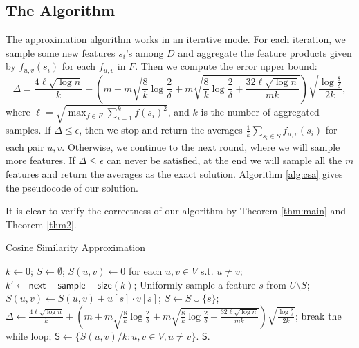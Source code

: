 \documentclass{article}
\begin{document}
\subsection{The Algorithm}
The approximation algorithm works in an iterative mode. For each iteration, we sample some new features $s_i$'s among $D$ and aggregate the feature products given by $f_{u,v}(s_i)$ for each $f_{u,v}$ in $F$. Then we compute the error upper bound:
$$\Delta = \frac{4\ell\sqrt{\log n}}{k} +\left(m+m\sqrt{\frac{8}{k}\log \frac{2}{\delta}} + m\sqrt{\frac{8}{k}\log \frac{2}{\delta} + \frac{32\ell\sqrt{\log n}}{mk}}\right)\sqrt{\frac{\log \frac{8}{\delta}}{2k}},$$
where $\ell = \sqrt{\max_{f\in F} \sum_{i=1}^k f(s_i)^2}$, and $k$ is the number of aggregated samples. 
If $\Delta \leq \epsilon$, then we stop and return the averages $\frac{1}{k}\sum_{s_i\in S}f_{u,v}(s_i)$ for each pair $u, v$. Otherwise, we continue to the next round, where we will sample more features. If $\Delta \leq \epsilon$ can never be satisfied, at the end we will sample all the $m$ features and return the averages as the exact solution. Algorithm \ref{alg:csa} gives the pseudocode of our solution.

It is clear to verify the correctness of our algorithm by Theorem \ref{thm:main} and Theorem \ref{thm2}.

\begin{algorithm}[!t]
\caption{\textsf{Cosine Similarity Approximation}}
\label{alg:csa}
\renewcommand{\algorithmicrequire}{\textbf{Input:}}
\renewcommand{\algorithmicensure}{\textbf{Output:}}
\begin{algorithmic}
\State $k \gets 0$;
\State $S \gets \emptyset$;
\State $S(u,v) \gets 0$ for each $u, v \in V$ s.t. $u\not= v$;
	\State $k' \gets \mathsf{next-sample-size}(k)$;
		\State Uniformly sample a feature $s$ from $U\setminus S$;
		\State $S(u,v) \gets S(u,v)+u[s]\cdot v[s]$;
		\State $S \gets S\cup \{s\}$;
	\EndFor
	\State $\Delta \gets \frac{4\ell\sqrt{\log n}}{k} +\left(m+m\sqrt{\frac{8}{k}\log \frac{2}{\delta}} + m\sqrt{\frac{8}{k}\log \frac{2}{\delta} + \frac{32\ell\sqrt{\log n}}{mk}}\right)\sqrt{\frac{\log \frac{8}{\delta}}{2k}}$;
	\If {$\Delta \leq \epsilon$}
		\State break the while loop;
	\EndIf
\EndWhile
\State $\mathsf{S} \gets \{S(u,v)/k : u,v\in V, u\not=v\}$.
 $\mathsf{S}$.
\end{algorithmic}
\end{algorithm}
\end{document}

